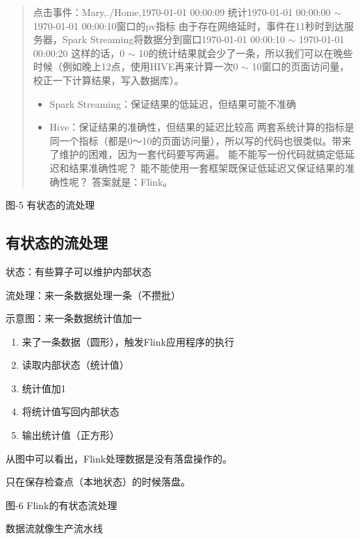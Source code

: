 \begin{quote}
点击事件：Mary,./Home,1970-01-01 00:00:09 统计1970-01-01 00:00:00
\(\sim\) 1970-01-01 00:00:10窗口的pv指标
由于存在网络延时，事件在11秒时到达服务器，Spark
Streaming将数据分到窗口1970-01-01 00:00:10 \(\sim\) 1970-01-01 00:00:20
这样的话，0 \(\sim\)
10的统计结果就会少了一条，所以我们可以在晚些时候（例如晚上12点，使用HIVE再来计算一次0
\(\sim\) 10窗口的页面访问量，校正一下计算结果，写入数据库）。

\begin{itemize}
\tightlist
\item
  Spark Streaming：保证结果的低延迟，但结果可能不准确
\item
  Hive：保证结果的准确性，但结果的延迟比较高
  两套系统计算的指标是同一个指标（都是0～10的页面访问量），所以写的代码也很类似。带来了维护的困难，因为一套代码要写两遍。
  能不能写一份代码就搞定低延迟和结果准确性呢？
  能不能使用一套框架既保证低延迟又保证结果的准确性呢？ 答案就是：Flink。
\end{itemize}
\end{quote}

图-5 有状态的流处理

\hypertarget{ux6709ux72b6ux6001ux7684ux6d41ux5904ux7406}{%
\subsection{有状态的流处理}\label{ux6709ux72b6ux6001ux7684ux6d41ux5904ux7406}}

状态：有些算子可以维护内部状态

流处理：来一条数据处理一条（不攒批）

示意图：来一条数据统计值加一

\begin{enumerate}
\def\labelenumi{\arabic{enumi}.}
\tightlist
\item
  来了一条数据（圆形），触发Flink应用程序的执行
\item
  读取内部状态（统计值）
\item
  统计值加1
\item
  将统计值写回内部状态
\item
  输出统计值（正方形）
\end{enumerate}

从图中可以看出，Flink处理数据是没有落盘操作的。

只在保存检查点（本地状态）的时候落盘。

图-6 Flink的有状态流处理

数据流就像生产流水线

